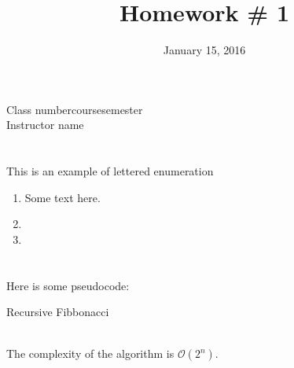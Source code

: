 \documentclass[12pt, letterpaper]{article}
\title{Homework \# 1}
\author{\yourName}
\date{January 15, 2016}
\newcommand{\classNumber}{Class number}
\newcommand{\instructor}{Instructor name}
\newcommand{\className}{course}
\newcommand{\semester}{semester}
\begin{document}
\begin{titlepage}
\clearpage\maketitle
\centering
\vspace{2.5cm}
\classNumber \qquad \className \qquad \semester\\
\vspace{0.5cm}
\instructor
\thispagestyle{empty}
\end{titlepage}

\section{}
This is an example of lettered enumeration
\begin{enumerate}[label=(\alph*)]
	\item
		Some text here.
	\item
	\item

\end{enumerate}

\section{}
Here is some pseudocode:
\begin{algorithm}
\caption{Recursive Fibbonacci}
\begin{algorithmic}
	\ENDIF
\end{algorithmic}
\end{algorithm}
\\
The complexity of the algorithm is $\mathcal{O}(2^n)$.
\end{document}
